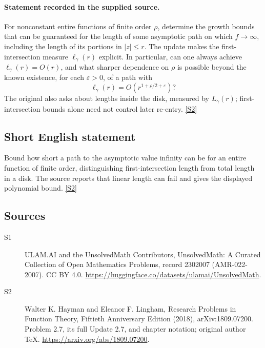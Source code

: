 \documentclass[11pt]{article}
\newcommand{\sref}[2]{\hyperlink{source:#1:#2}{[S#2]}}
\begin{document}
\paragraph{Statement recorded in the supplied source.}
For nonconstant entire functions of finite order $\rho$, determine the growth bounds that can be guaranteed for the length of some asymptotic path on which $f\to\infty$, including the length of its portions in $|z|\le r$. The update makes the first-intersection measure $\ell_\gamma(r)$ explicit. In particular, can one always achieve $\ell_\gamma(r)=O(r)$, and what sharper dependence on $\rho$ is possible beyond the known existence, for each $\varepsilon>0$, of a path with
\[
 \ell_\gamma(r)=O(r^{1+\rho/2+\varepsilon})?
\]
The original also asks about lengths inside the disk, measured by $L_\gamma(r)$; first-intersection bounds alone need not control later re-entry. \sref{2302007}{2}
\subsection{Short English statement}
Bound how short a path to the asymptotic value infinity can be for an entire function of finite order, distinguishing first-intersection length from total length in a disk. The source reports that linear length can fail and gives the displayed polynomial bound. \sref{2302007}{2}
\subsection{Sources}
\begin{description}
\item[\hypertarget{source:2302007:1}{S1}] ULAM.AI and the UnsolvedMath Contributors, UnsolvedMath: A Curated Collection of Open Mathematics Problems, record 2302007 (AMR-022-2007). CC BY 4.0. \url{https://huggingface.co/datasets/ulamai/UnsolvedMath}.
\item[\hypertarget{source:2302007:2}{S2}] Walter K. Hayman and Eleanor F. Lingham, Research Problems in Function Theory, Fiftieth Anniversary Edition (2018), arXiv:1809.07200. Problem 2.7, its full Update 2.7, and chapter notation; original author TeX. \url{https://arxiv.org/abs/1809.07200}.
\end{description}
\label{end:2302007}
\end{document}
